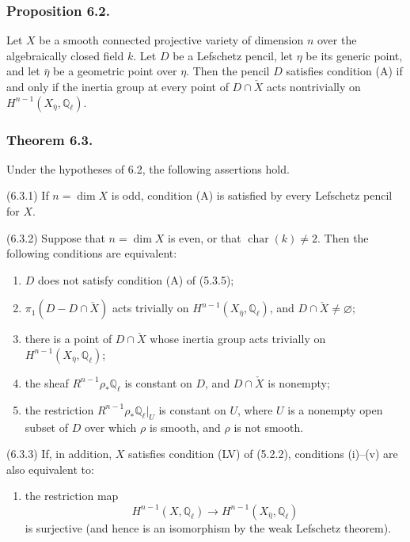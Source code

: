 \subsubsection*{Proposition 6.2.}
Let $X$ be a smooth connected projective variety of dimension $n$ over
the algebraically closed field $k$.  Let $D$ be a Lefschetz pencil, let
$\eta$ be its generic point, and let $\bar\eta$ be a geometric point
over $\eta$.  Then the pencil $D$ satisfies condition (A) if and only if
the inertia group at every point of $D\cap\check X$ acts nontrivially on
$H^{n-1}(X_{\bar\eta},\mathbb Q_\ell)$.

\subsubsection*{Theorem 6.3.}
Under the hypotheses of 6.2, the following assertions hold.

\medskip
\noindent
\textup{(6.3.1)} If $n=\dim X$ is odd, condition (A) is satisfied by
every Lefschetz pencil for $X$.

\medskip
\noindent
\textup{(6.3.2)} Suppose that $n=\dim X$ is even, or that
$\operatorname{char}(k)\ne2$.  Then the following conditions are
equivalent:
\begin{enumerate}
\item[(i)] $D$ does not satisfy condition (A) of (5.3.5);
\item[(ii)] $\pi_1(D-D\cap\check X)$ acts trivially on
  $H^{n-1}(X_{\bar\eta},\mathbb Q_\ell)$, and
  $D\cap\check X\ne\varnothing$;
\item[(iii)] there is a point of $D\cap\check X$ whose inertia group
  acts trivially on $H^{n-1}(X_{\bar\eta},\mathbb Q_\ell)$;
\item[(iv)] the sheaf $R^{n-1}\rho_*\mathbb Q_\ell$ is constant on
  $D$, and $D\cap\check X$ is nonempty;
\item[(v)] the restriction
  $R^{n-1}\rho_*\mathbb Q_\ell\vert_U$ is constant on $U$, where $U$
  is a nonempty open subset of $D$ over which $\rho$ is smooth, and
  $\rho$ is not smooth.
\end{enumerate}

\noindent
\textup{(6.3.3)} If, in addition, $X$ satisfies condition (LV) of
(5.2.2), conditions (i)--(v) are also equivalent to:
\begin{enumerate}
\item[(vi)] the restriction map
\[
H^{n-1}(X,\mathbb Q_\ell)
\longrightarrow H^{n-1}(X_{\bar\eta},\mathbb Q_\ell)
\]
is surjective (and hence is an isomorphism by the weak Lefschetz
theorem).
\end{enumerate}

